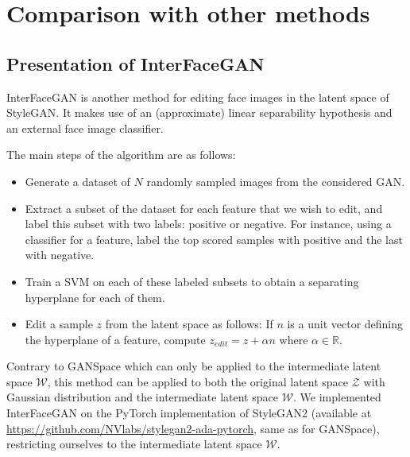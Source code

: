 \documentclass[a4paper]{article}
\begin{document}
\section{Comparison with other methods}

\subsection{Presentation of InterFaceGAN}
\label{subsect:interfacegan_pres}

InterFaceGAN \cite{shen2020interfacegan} is another method for editing face images in the latent space of StyleGAN. It makes use of an (approximate) linear separability hypothesis and an external face image classifier.

The main steps of the algorithm are as follows:
\begin{itemize}
    \item Generate a dataset of $N$ randomly sampled images from the considered GAN.
    \item Extract a subset of the dataset for each feature that we wish to edit, and label this subset with two labels: positive or negative. For instance, using a classifier for a feature, label the top  scored samples with positive and the last  with negative.
    \item Train a SVM on each of these labeled subsets to obtain a separating hyperplane for each of them.
    \item Edit a sample $z$ from the latent space as follows:
    If $n$ is a unit vector defining the hyperplane of a feature, compute $z_{edit} = z + \alpha n$ where $\alpha \in \mathbb{R}$.
\end{itemize}
Contrary to GANSpace which can only be applied to the intermediate latent space $\mathcal{W}$, this method can be applied to both the original latent space $\mathcal{Z}$ with Gaussian distribution and the intermediate latent space $\mathcal{W}$. We implemented InterFaceGAN on the PyTorch implementation of StyleGAN2 (available at \url{https://github.com/NVlabs/stylegan2-ada-pytorch}, same as for GANSpace), restricting ourselves to the intermediate latent space $\mathcal{W}$.

\end{document}
